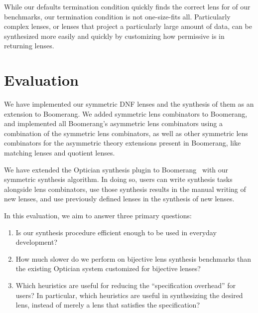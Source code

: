 \documentclass[acmsmall,screen,anonymous]{acmart}
\begin{document}
While our defaults termination condition quickly finds the correct lens for
 of our  benchmarks, our termination condition is not
one-size-fits all. Particularly complex lenses, or lenses that project a
particularly large amount of data, can be synthesized more easily and quickly by
customizing how permissive \RXSearch is in returning lenses.

\section{Evaluation}
\label{sec:evaluation}
We have implemented our symmetric DNF lenses and the synthesis of them as an
extension to Boomerang. We added symmetric lens combinators to Boomerang, and
implemented all Boomerang's asymmetric lens combinators using a combination of
the symmetric lens combinators, as well as other symmetric lens combinators for
the asymmetric theory extensions present in Boomerang, like matching lenses and
quotient lenses.

We have extended the Optician synthesis plugin to Boomerang~\cite{?} with our
symmetric synthesis algorithm. In doing so, users can write synthesis tasks
alongside lens combinators, use those synthesis results in the manual writing of
new lenses, and use previously defined lenses in the synthesis of new lenses.

In this evaluation, we aim to answer three primary questions:
\begin{enumerate}
\item Is our synthesis procedure efficient enough to be used in everyday
  development?

\item How much slower do we perform on bijective lens synthesis benchmarks than
  the existing Optician system customized for bijective lenses?
  
\item Which heuristics are useful for reducing the ``specification
  overhead'' for users? In particular, which heuristics are useful in
  synthesizing the desired lens, instead of merely a lens that satisfies the
  specification?
\end{enumerate}
\end{document}
